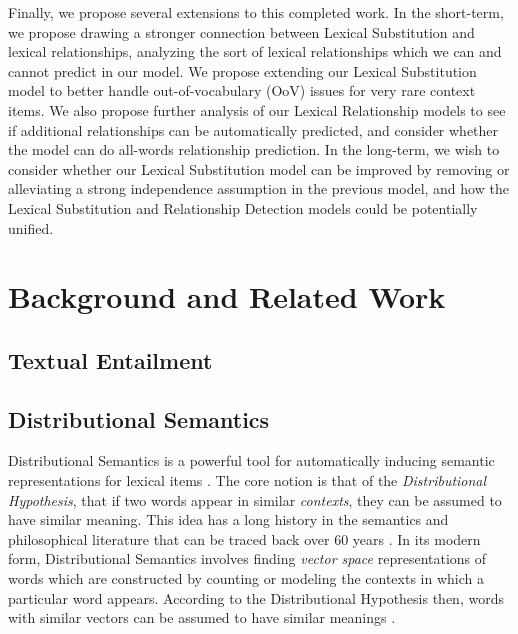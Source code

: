 \documentclass[12pt]{article}
\begin{document}
Finally, we propose several extensions to this completed work. In the
short-term, we propose drawing a stronger connection between Lexical
Substitution and lexical relationships, analyzing the sort of lexical
relationships which we can and cannot predict in our model. We propose
extending our Lexical Substitution model to better handle out-of-vocabulary
(OoV) issues for very rare context items. We also propose further analysis of
our Lexical Relationship models to see if additional relationships can be
automatically predicted, and consider whether the model can do all-words
relationship prediction.  In the long-term, we wish to consider whether our
Lexical Substitution model can be improved by removing or alleviating a strong
independence assumption in the previous model, and how the Lexical Substitution
and Relationship Detection models could be potentially unified.


\section{Background and Related Work}
\label{sec:background}

\subsection{Textual Entailment}
\label{sec:textent}

\subsection{Distributional Semantics}
\label{sec:dist}

Distributional Semantics is a powerful tool for automatically inducing semantic
representations for lexical items \cite{turney:2010:jair,erk:2012:llc}.  The
core notion is that of the {\em Distributional Hypothesis}, that if two words
appear in similar {\em contexts}, they can be assumed to have similar meaning.
This idea has a long history in the semantics and philosophical literature that
can be traced back over 60 years
\cite{wittgenstein:1953:pi,harris:1954:word,firth:1957:la}. In its modern form,
Distributional Semantics involves finding {\em vector space} representations of
words which are constructed by counting or modeling the contexts in which a
particular word appears. According to the Distributional Hypothesis then, words
with similar vectors can be assumed to have similar meanings
\cite{turney:2010:jair}.
\end{document}
